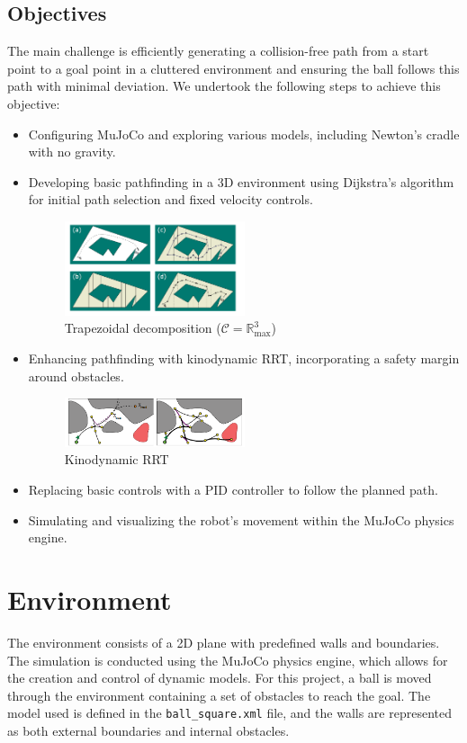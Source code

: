 \documentclass[12pt]{article}
\begin{document}
\subsection{Objectives}
The main challenge is efficiently generating a collision-free path from a start point to a goal point in a cluttered environment and ensuring the ball follows this path with minimal deviation. We undertook the following steps to achieve this objective:
\begin{itemize}
    \item Configuring MuJoCo and exploring various models, including Newton’s cradle with no gravity.
    \item Developing basic pathfinding in a 3D environment using Dijkstra’s algorithm for initial path selection and fixed velocity controls.
    \begin{figure}[h!]
        \centering
        \includegraphics[width=0.5\textwidth]{./images/trapezoidal.png}
        \caption{Trapezoidal decomposition (\(\mathcal{C} = \mathbb{R}^3_{\text{max}}\))\cite{mobile_robotics}}
        \label{fig:trapezoidal}
    \end{figure}
    \item Enhancing pathfinding with kinodynamic RRT, incorporating a safety margin around obstacles.
    \begin{figure}[h!]
        \centering
        \includegraphics[width=0.5\textwidth]{./images/kinodyanmics.png}
        \caption{Kinodynamic RRT}
        \label{fig:kinodynamic}
    \end{figure}
    \item Replacing basic controls with a PID controller to follow the planned path.
    \item Simulating and visualizing the robot’s movement within the MuJoCo physics engine.
\end{itemize}

\section{Environment}
The environment consists of a 2D plane with predefined walls and boundaries. The simulation is conducted using the MuJoCo physics engine, which allows for the creation and control of dynamic models. For this project, a ball is moved through the environment containing a set of obstacles to reach the goal. The model used is defined in the \texttt{ball\_square.xml} file, and the walls are represented as both external boundaries and internal obstacles.
\end{document}
